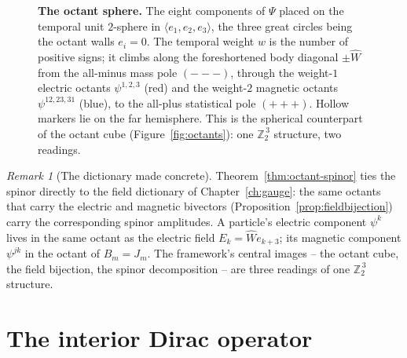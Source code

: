 \documentclass[11pt,oneside]{book}
\newcommand{\Wh}{\hat{W}}                         %
\newcommand{\Zt}{\mathbb{Z}_2}
\theoremstyle{plain}
\theoremstyle{definition}
\theoremstyle{remark}
\newtheorem{remark}[theorem]{Remark}
\begin{document}
\begin{figure}[t]
\caption{\textbf{The octant sphere.} The eight components of $\Psi$ placed on the temporal
unit $2$-sphere in $\langle e_1,e_2,e_3\rangle$, the three great circles being the octant
walls $e_i=0$. The temporal weight $w$ is the number of positive signs; it climbs along the
foreshortened body diagonal $\pm\Wh$ from the all-minus mass pole $({-}{-}{-})$, through the
weight-$1$ electric octants $\psi^{1,2,3}$ {\color{elec}(red)} and the weight-$2$ magnetic
octants $\psi^{12,23,31}$ {\color{magn}(blue)}, to the all-plus statistical pole
$({+}{+}{+})$. Hollow markers lie on the far hemisphere. This is the spherical counterpart of
the octant cube (Figure~\ref{fig:octants}): one $\Zt^{\,3}$ structure, two readings.}
\label{fig:octant-sphere}
\end{figure}

\begin{remark}[The dictionary made concrete]
Theorem~\ref{thm:octant-spinor} ties the spinor directly to the field dictionary of
Chapter~\ref{ch:gauge}: the same octants that carry the electric and magnetic
bivectors (Proposition~\ref{prop:fieldbijection}) carry the corresponding spinor
amplitudes. A particle's electric component $\psi^k$ lives in the same octant as the
electric field $E_k=\Wh e_{k+3}$; its magnetic component $\psi^{jk}$ in the octant of
$B_m=J_m$. The framework's central images -- the octant cube, the field bijection,
the spinor decomposition -- are three readings of one $\Zt^{\,3}$ structure.
\end{remark}

\section{The interior Dirac operator}
\label{sec:dirac-op}
\end{document}
